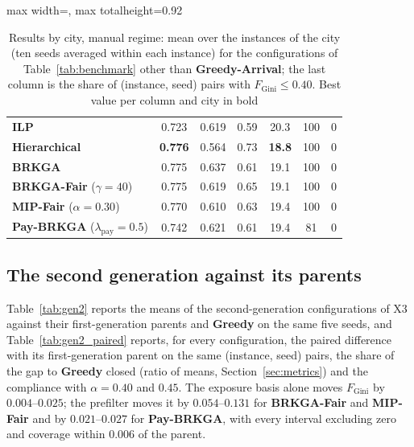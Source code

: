 \documentclass[a4paper,11pt,review,3p,authoryear]{elsarticle}
\newlength{\portraitwidth}\AtBeginDocument{\setlength{\portraitwidth}{\textwidth}} %
\newcommand{\FG}{F_{\text{Gini}}}
\begin{document}
\begin{table}
\begin{adjustbox}{max width=\textheight, max totalheight=0.92\portraitwidth}
\begin{tabular}{l|c|c|c|c|c|c}
\textbf{ILP} & 0.723 & 0.619 & 0.59 & 20.3 & 100 & 0 \\
\textbf{Hierarchical} & \textbf{0.776} & 0.564 & 0.73 & \textbf{18.8} & 100 & 0 \\
\textbf{BRKGA} & 0.775 & 0.637 & 0.61 & 19.1 & 100 & 0 \\
\textbf{BRKGA-Fair} ($\gamma = 40$) & 0.775 & 0.619 & 0.65 & 19.1 & 100 & 0 \\
\textbf{MIP-Fair} ($\alpha = 0.30$) & 0.770 & 0.610 & 0.63 & 19.4 & 100 & 0 \\
\textbf{Pay-BRKGA} ($\lambda_{\text{pay}} = 0.5$) & 0.742 & 0.621 & 0.61 & 19.4 & 81 & 0 \\
\hline
\end{tabular}
\end{adjustbox}
\caption{Results by city, manual regime: mean over the instances of the city (ten seeds averaged within each instance) for the configurations of Table~\ref{tab:benchmark} other than \textbf{Greedy-Arrival}; the last column is the share of (instance, seed) pairs with $\FG \le 0.40$. Best value per column and city in bold}
\label{tab:city}
\end{table}

\subsection{The second generation against its parents}
\label{sec:App_gen2}

Table~\ref{tab:gen2} reports the means of the second-generation configurations of X3 against their first-generation parents and \textbf{Greedy} on the same five seeds, and Table~\ref{tab:gen2_paired} reports, for every configuration, the paired difference with its first-generation parent on the same (instance, seed) pairs, the share of the gap to \textbf{Greedy} closed (ratio of means, Section~\ref{sec:metrics}) and the compliance with $\alpha = 0.40$ and $0.45$. The exposure basis alone moves $\FG$ by $0.004$--$0.025$; the prefilter moves it by $0.054$--$0.131$ for \textbf{BRKGA-Fair} and \textbf{MIP-Fair} and by $0.021$--$0.027$ for \textbf{Pay-BRKGA}, with every interval excluding zero and coverage within $0.006$ of the parent.
\end{document}
